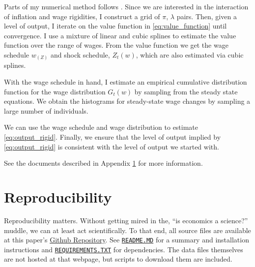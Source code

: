 \documentclass[12pt,a4paper]{scrartcl}            %
\begin{document}
Parts of my numerical method follows \cite{daly_hobijn_2013}.
Since we are interested in the interaction of inflation and wage rigidities, I construct a grid of $\pi$, $\lambda$ pairs.
Then, given a level of output, I iterate on the value function in \eqref{eq:value_function} until convergence.
I use a mixture of linear and cubic splines to estimate the value function over the range of wages.
From the value function we get the wage schedule $w_(Z)$ and shock schedule, $Z_t(w)$, which are also estimated via cubic splines.

With the wage schedule in hand, I estimate an empirical cumulative distribution function for the wage distribution $G_t(w)$ by sampling from the steady state equations.
We obtain the histograms for steady-state wage changes by sampling a large number of individuals.

We can use the wage schedule and wage distribution to estimate \eqref{eq:output_rigid}.
Finally, we ensure that the level of output implied by \eqref{eq:output_rigid} is consistent with the level of output we started with.

See the documents described in Appendix \ref{sec:reproducability} for more information.

\section{Reproducibility}
\label{sec:reproducability}

Reproducibility matters.
Without getting mired in the, ``is economics a science?'' muddle, we can at least act scientifically.
To that end, all source files are available at this paper's \href{https://github.com/tomAugspurger/dnwr-zlb}{Github Repository}.
See \href{https://github.com/TomAugspurger/dnwr-zlb/blob/master/README.md}{\texttt{README.MD}} for a summary and installation instructions and \href{https://github.com/TomAugspurger/dnwr-zlb/blob/master/REQUIREMENTS.TXT}{\texttt{REQUIREMENTS.TXT}} for dependencies.
The data files themselves are not hosted at that webpage, but scripts to download them are included.
\end{document}
